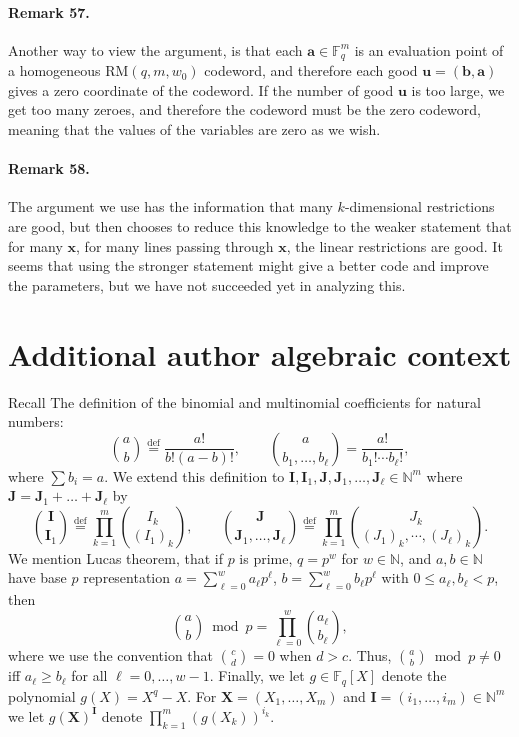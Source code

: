 \documentclass[10pt,a4paper]{article}
\begin{document}
\paragraph{Remark 57.} Another way to view the argument, is that each $\boldsymbol a\in\mathbb F_q^m$ is an evaluation point of a homogeneous $\mathrm{RM}(q,m,w_0)$ codeword, and therefore each good $\boldsymbol u=(\boldsymbol b,\boldsymbol a)$ gives a zero coordinate of the codeword. If the number of good $\boldsymbol u$ is too large, we get too many zeroes, and therefore the codeword must be the zero codeword, meaning that the values of the variables are zero as we wish.
\paragraph{Remark 58.} The argument we use has the information that many $k$-dimensional restrictions are good, but then chooses to reduce this knowledge to the weaker statement that for many $\boldsymbol x$, for many lines passing through $\boldsymbol x$, the linear restrictions are good. It seems that using the stronger statement might give a better code and improve the parameters, but we have not succeeded yet in analyzing this.

\section*{Additional author algebraic context}
Recall The definition of the binomial and multinomial coefficients for natural numbers:
\[\binom ab\stackrel{\mathrm{def}}=\frac{a!}{b!(a-b)!},\qquad\binom a{b_1,\ldots,b_\ell}=\frac{a!}{b_1!\cdots b_\ell!},\]
where $\sum b_i=a$. We extend this definition to $\boldsymbol I,\boldsymbol I_1,\boldsymbol J,\boldsymbol J_1,\ldots,\boldsymbol J_\ell\in\mathbb N^m$ where $\boldsymbol J=\boldsymbol J_1+\ldots+\boldsymbol J_\ell$ by
\[\binom{\boldsymbol I}{\boldsymbol I_1}\stackrel{\mathrm{def}}=\prod_{k=1}^m\binom{I_k}{(I_1)_k},\qquad\binom{\boldsymbol J}{\boldsymbol J_1,\ldots,\boldsymbol J_\ell}\stackrel{\mathrm{def}}=\prod_{k=1}^m\binom{J_k}{(J_1)_k,\cdots,(J_\ell)_k}.\]
We mention Lucas theorem, that if $p$ is prime, $q=p^w$ for $w\in\mathbb N$, and $a,b\in\mathbb N$ have base $p$ representation $a=\sum_{\ell=0}^wa_\ell p^\ell$, $b=\sum_{\ell=0}^wb_\ell p^\ell$ with $0\leq a_\ell,b_\ell<p$, then
\[\binom ab\bmod p=\prod_{\ell=0}^w\binom{a_\ell}{b_\ell},\tag{4}\]
where we use the convention that $\binom cd=0$ when $d>c$. Thus, $\binom ab\bmod p\neq0$ iff $a_\ell\geq b_\ell$ for all $\ell=0,\ldots,w-1$.
Finally, we let $g\in\mathbb F_q[X]$ denote the polynomial $g(X)=X^q-X$. For $\boldsymbol X=(X_1,\ldots,X_m)$ and $\boldsymbol I=(i_1,\ldots,i_m)\in\mathbb N^m$ we let $g(\boldsymbol X)^{\boldsymbol I}$ denote $\prod_{k=1}^m(g(X_k))^{i_k}$.
\end{document}
